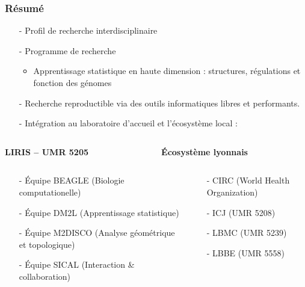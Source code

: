 \documentclass[11pt,xcolor=dvipsnames]{beamer}
\begin{document}
\begin{frame}
\frametitle{Résumé}
\begin{itemize}
\small
\item[-] Profil de recherche interdisciplinaire
\item[-] Programme de recherche \\
\begin{itemize}
\item Apprentissage statistique en haute dimension : structures,
régulations et fonction des génomes
\end{itemize}
\item[-] Recherche reproductible via des outils informatiques libres et
performants.
\item[-] Intégration au laboratoire d'accueil et l'écosystème local :
\end{itemize}

\begin{columns}
\begin{column}{0.49\linewidth}
\centering
\tiny
{\bf LIRIS -- UMR 5205}
\end{column}
\begin{column}{0.49\linewidth}
\tiny
\centering
{\bf Écosystème lyonnais}
\end{column}

\end{columns}
\begin{columns}
\tiny
\begin{column}{0.49\linewidth}
\begin{itemize}
\item[-] {\color{red} Équipe BEAGLE} (Biologie computationelle)
\item[-] Équipe DM2L (Apprentissage statistique)
\item[-] Équipe M2DISCO (Analyse géométrique et topologique)
\item[-] Équipe SICAL (Interaction \& collaboration)
\end{itemize}
\end{column}

\begin{column}{0.49\linewidth}
\begin{itemize}
\item[-] CIRC (World Health Organization)
\item[-] ICJ (UMR 5208)
\item[-] LBMC (UMR 5239)
\item[-] LBBE (UMR 5558)
\end{itemize}
\end{column}
\end{columns}


\end{frame}
\end{document}
